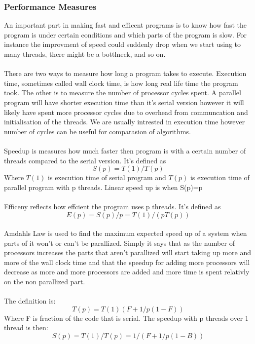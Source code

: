 \documentclass[10pt,a4paper]{article}
\begin{document}
\subsubsection{Performance Measures}
An important part in making fast and efficent programs is to know how fast the program is under certain conditions and which parts of the program is slow. For instance the improvment of speed could suddenly drop when we start using to many threads, there might be a bottlneck, and so on.\\
\\
There are two ways to measure how long a program takes to execute. Execution time, sometimes called wall clock time, is how long real life time the program took. The other is to measure the number of processor cycles spent. A parallel program will have shorter execution time than it's serial version however it will likely have spent more processor cycles due to overhead from communcation and initialisation of the threads. We are usually intrested in execution time however number of cycles can be useful for comparasion of algorithms.\\
\\
Speedup is measures how much faster then program is with a certain number of threads compared to the serial version. It's defined as
$$S(p)=T(1)/T(p)$$
Where $T(1)$ is execution time of serial program and $T(p)$ is execution time of parallel program with p threads. Linear speed up is when S(p)=p\\
\\
Efficeny reflects how effcient the program uses p threads. It's defined as
$$E(p)=S(p)/p=T(1)/(pT(p))$$
\\
Amdahls Law is used to find the maximum expected speed up of a system when parts of it won't or can't be parallized. Simply it says that as the number of processors increases the parts that aren't parallized will start taking up more and more of the wall clock time and that the speedup for adding more processors will decrease as more and more processors are added and more time is spent relativly on the non parallized part.\\
\\
The definition is:\\
$$T(p)=T(1)(F+1/p(1-F))$$
Where F is fraction of the code that is serial. The speedup with p threads over 1 thread is then:
$$S(p)=T(1)/T(p)=1/(F+1/p(1-B))$$
\end{document}
